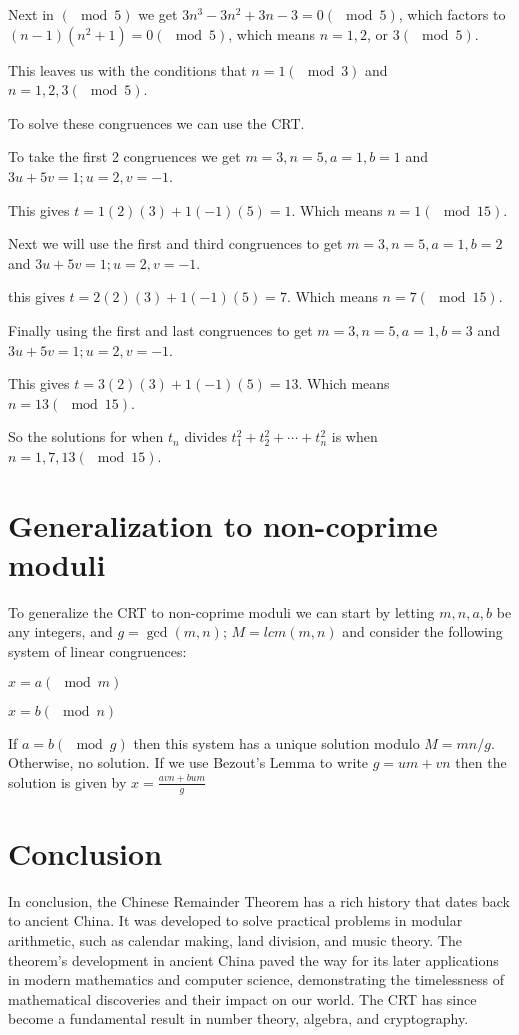 \documentclass[12pt]{article}
\begin{document}
Next in $(\mod 5)$ we get $3n^3 - 3n^2 + 3n - 3 = 0 (\mod 5)$, which factors to
$(n-1)(n^2+1) = 0 (\mod 5)$, which means $n = 1,2$, or $3 (\mod 5)$.

This leaves us with the conditions that $n = 1 (\mod 3)$ and $n = 1,2,3 (\mod 5)$.

To solve these congruences we can use the CRT.

To take the first 2 congruences we get $m = 3, n = 5, a = 1, b = 1$ and $3u + 5v = 1; u = 2, v = -1$.

This gives $t = 1(2)(3) + 1(-1)(5) = 1$. Which means $n = 1 (\mod 15)$.

Next we will use the first and third congruences to get $m = 3, n = 5, a = 1, b = 2$ and $3u + 5v = 1; u = 2, v = -1$.

this gives $t = 2(2)(3) + 1(-1)(5) = 7$. Which means $n = 7 (\mod 15)$.

Finally using the first and last congruences to get $m = 3, n = 5, a = 1, b = 3$ and $3u + 5v = 1; u = 2, v = -1$.

This gives $t = 3(2)(3) + 1(-1)(5) = 13$. Which means $n = 13 (\mod 15)$.

So the solutions for when $t_n$ divides $t^2_1 + t^2_2 + \cdots + t^2_n$ is when $n = 1, 7, 13 (\mod 15)$.


\section*{Generalization to non-coprime moduli}
To generalize the CRT to non-coprime moduli we can start by letting
$m,n,a,b$ be any integers, and $g = \gcd(m,n)$; $M = lcm(m,n)$ and consider
the following system of linear congruences:
\begin{center}
    $x = a (\mod m)$

    $x = b (\mod n)$
\end{center}
If $a = b ( \mod g)$ then this system has a unique solution modulo $M = mn/g$. Otherwise, no solution.
If we use Bezout's Lemma to write $g = um + vn$ then the solution is given by $x = \frac{avn+bum}{g}$

\section*{Conclusion}

In conclusion, the Chinese Remainder Theorem has a rich history that dates 
back to ancient China. It was developed to solve practical problems in 
modular arithmetic, such as calendar making, land division, and music theory. 
The theorem's development in ancient China paved the way for its later 
applications in modern mathematics and computer science, demonstrating the 
timelessness of mathematical discoveries and their impact on our world. The 
CRT has since become a fundamental result in number theory, algebra, and 
cryptography.
\end{document}
